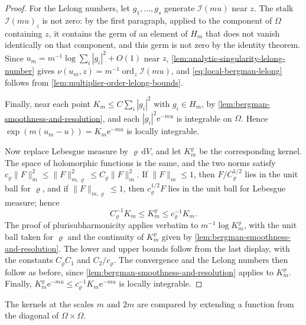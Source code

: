 \begin{proof}
For the Lelong numbers, let $g_1,\ldots,g_s$ generate $\mathcal I(mu)$ near $z$. The stalk $\mathcal I(mu)_z$ is not zero: by the first paragraph, applied to the component of $\Omega$ containing $z$, it contains the germ of an element of $H_m$ that does not vanish identically on that component, and this germ is not zero by the identity theorem. Since $u_m=m^{-1}\log\sum_i|g_i|^2+O(1)$ near $z$, \cref{lem:analytic-singularity-lelong-number} gives $\nu(u_m,z)=m^{-1}\operatorname{ord}_z\mathcal I(mu)$, and \eqref{eq:local-bergman-lelong} follows from \cref{lem:multiplier-order-lelong-bounds}.

Finally, near each point $K_m\leq C\sum_i|g_i|^2$ with $g_i\in H_m$, by \cref{lem:bergman-smoothness-and-resolution}, and each $|g_i|^2\mathrm e^{-mu}$ is integrable on $\Omega$. Hence $\exp(m(u_m-u))=K_m\mathrm e^{-mu}$ is locally integrable.

Now replace Lebesgue measure by $\varrho\,\mathrm dV$, and let $K^\varrho_m$ be the corresponding kernel. The space of holomorphic functions is the same, and the two norms satisfy $c_\varrho\|F\|_m^2\leq\|F\|_{m,\varrho}^2\leq C_\varrho\|F\|_m^2$. If $\|F\|_m\leq1$, then $F/C_\varrho^{1/2}$ lies in the unit ball for $\varrho$, and if $\|F\|_{m,\varrho}\leq1$, then $c_\varrho^{1/2}F$ lies in the unit ball for Lebesgue measure; hence
\[
 C_\varrho^{-1}K_m\leq K^\varrho_m\leq c_\varrho^{-1}K_m.
\]
The proof of plurisubharmonicity applies verbatim to $m^{-1}\log K^\varrho_m$, with the unit ball taken for $\varrho$ and the continuity of $K^\varrho_m$ given by \cref{lem:bergman-smoothness-and-resolution}. The lower and upper bounds follow from the last display, with the constants $C_\varrho C_1$ and $C_2/c_\varrho$. The convergence and the Lelong numbers then follow as before, since \cref{lem:bergman-smoothness-and-resolution} applies to $K^\varrho_m$. Finally, $K^\varrho_m\mathrm e^{-mu}\leq c_\varrho^{-1}K_m\mathrm e^{-mu}$ is locally integrable.
\end{proof}

The kernels at the scales $m$ and $2m$ are compared by extending a function from the diagonal of $\Omega\times\Omega$.


